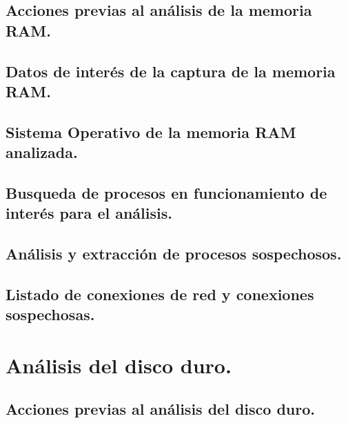 \documentclass[12pt,a4paper]{report}
\begin{document}
\section{Acciones previas al análisis de la memoria RAM.}


\section{Datos de interés de la captura de la memoria RAM.}


\section{Sistema Operativo de la memoria RAM analizada.}


\section{Busqueda de procesos en funcionamiento de interés para el análisis.}


\section{Análisis y extracción de procesos sospechosos.}


\section{Listado de conexiones de red y conexiones sospechosas.}


\chapter{Análisis del disco duro.}


\section{Acciones previas al análisis del disco duro.}

\end{document}
